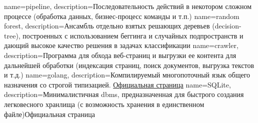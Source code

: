 {
    name=pipeline,
    description={Последовательность действий в некотором сложном процессе (обработка данных, бизнес-процесс команды и т.п.)}
}
{
    name=random forest,
    description={Ансамбль отдельно взятых решающих деревьев (\gls{decision-tree}), построенных с использованием беггинга и случайных подпространств и дающий высокое качество решения в задачах классификации}
}
{
    name=crawler,
    description={Программа для обхода веб-страниц и выгрузки ее контента для дальнейшей обработки (индексация страниц, поиск документов, выгрузка текстов и т.д.)}
}
{
    name=golang,
    description={Компилируемый многопоточный язык общего назначения со строгой типизацией. \href{https://go.dev/}{Официальная страница}}
}
{
    name=SQLite,
    description={Минималистичная \acrshort{dbms}, предназначенная для быстрого создания легковесного хранлища (с возможность хранения в единственном файле)Официальная страница}
}
